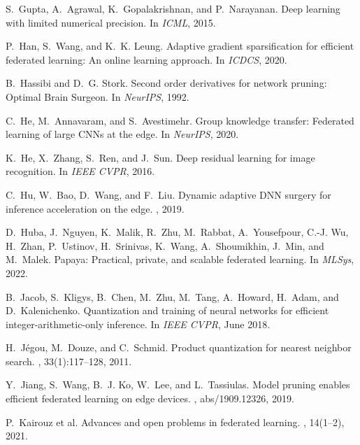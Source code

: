 \documentclass[11pt]{article}
\begin{document}
\begin{thebibliography}{10}
\begin{small}
S.~Gupta, A.~Agrawal, K.~Gopalakrishnan, and P.~Narayanan.
\newblock Deep learning with limited numerical precision.
\newblock In {\em ICML}, 2015.

P.~Han, S.~Wang, and K.~K. Leung.
\newblock Adaptive gradient sparsification for efficient federated learning: An
  online learning approach.
\newblock In {\em ICDCS}, 2020.

B.~Hassibi and D.~G. Stork.
\newblock Second order derivatives for network pruning: {O}ptimal {B}rain
  {S}urgeon.
\newblock In {\em NeurIPS}, 1992.

C.~He, M.~Annavaram, and S.~Avestimehr.
\newblock Group knowledge transfer: Federated learning of large {CNN}s at the
  edge.
\newblock In {\em NeurIPS}, 2020.

K.~He, X.~Zhang, S.~Ren, and J.~Sun.
\newblock Deep residual learning for image recognition.
\newblock In {\em {IEEE} CVPR}, 2016.

C.~Hu, W.~Bao, D.~Wang, and F.~Liu.
\newblock Dynamic adaptive {DNN} surgery for inference acceleration on the
  edge.
, 2019.

D.~Huba, J.~Nguyen, K.~Malik, R.~Zhu, M.~Rabbat, A.~Yousefpour, C.-J. Wu,
  H.~Zhan, P.~Ustinov, H.~Srinivas, K.~Wang, A.~Shoumikhin, J.~Min, and
  M.~Malek.
\newblock Papaya: Practical, private, and scalable federated learning.
\newblock In {\em MLSys}, 2022.

B.~Jacob, S.~Kligys, B.~Chen, M.~Zhu, M.~Tang, A.~Howard, H.~Adam, and
  D.~Kalenichenko.
\newblock Quantization and training of neural networks for efficient
  integer-arithmetic-only inference.
\newblock In {\em IEEE CVPR}, June 2018.

H.~J{\'{e}}gou, M.~Douze, and C.~Schmid.
\newblock Product quantization for nearest neighbor search.
, 33(1):117--128,
  2011.

Y.~Jiang, S.~Wang, B.~J. Ko, W.~Lee, and L.~Tassiulas.
\newblock Model pruning enables efficient federated learning on edge devices.
, abs/1909.12326, 2019.

P.~{Kairouz et al.}
\newblock Advances and open problems in federated learning.
, 14(1–2), 2021.


\end{small}
\end{thebibliography}
\end{document}
